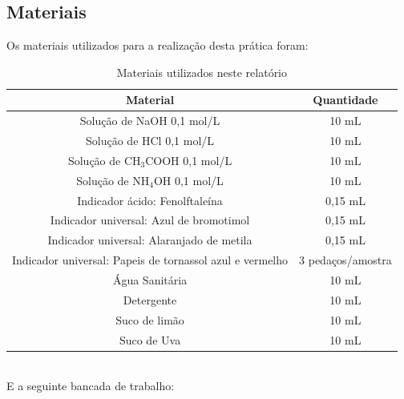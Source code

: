 
\subsection{Materiais}\label{subsec:mat_materiais}
    \indent Os materiais utilizados para a realização desta prática foram:
        \begin{table}[h]
        \label{tab:materiais}
        \centering
        \begin{tabular}{|c|c|}
            \hline
            \textbf{Material} & \textbf{Quantidade} \\
            \hline
            Solução de NaOH 0,1 mol/L & 10 mL \\
            \hline
            Solução de HCl 0,1 mol/L & 10 mL \\
            \hline
            Solução de CH$_3$COOH 0,1 mol/L & 10 mL \\
            \hline
            Solução de NH$_4$OH 0,1 mol/L & 10 mL \\
            \hline
            Indicador ácido: Fenolftaleína & 0,15 mL \\
            \hline
            Indicador universal: Azul de bromotimol & 0,15 mL \\
            \hline
            Indicador universal: Alaranjado de metila & 0,15 mL \\
            \hline
            Indicador universal: Papeis de tornassol azul e vermelho & 3 pedaços/amostra \\
            \hline
            Água Sanitária & 10 mL \\
            \hline
            Detergente & 10 mL \\
            \hline
            Suco de limão & 10 mL \\
            \hline
            Suco de Uva & 10 mL \\
            \hline
        \end{tabular}
            \caption{Materiais utilizados neste relatório}
    \end{table}\\
    \newpage
    \indent E a seguinte bancada de trabalho:\\
